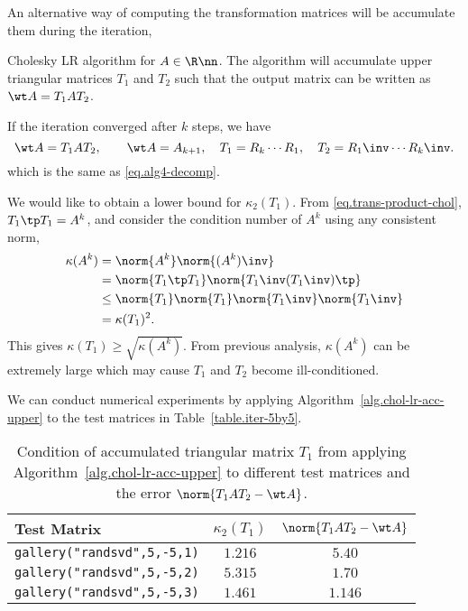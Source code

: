An alternative way of computing the transformation matrices will be
accumulate them during the iteration,
\begin{algorithm}[H]
\caption{Cholesky LR algorithm for $A\in\R\nn$. The algorithm will
  accumulate upper triangular matrices $T_{1}$ and $T_{2}$ such that the
  output matrix can be written as $\wt A = T_{1} A T_{2}$.}
\label{alg.chol-lr-acc-upper}
\begin{algorithmic}[1]
\EndIf
\EndFor
{}
\end{algorithmic}
\end{algorithm}
If the iteration converged after $k$ steps, we have
\begin{equation}\notag
  \wt A = T_{1}AT_{2}, \qquad \wt A = A_{k+1},
  \quad T_{1} = R_{k}\cdots R_{1},
  \quad T_{2} = R_{1}\inv \cdots R_{k}\inv.
\end{equation}
which is the same as \eqref{eq.alg4-decomp}.

We would like to obtain a lower bound for $\kappa_{2}(T_{1})$.
From \eqref{eq.trans-product-chol}, $T_{1}\tp T_{1} = A^{k}$, and consider
the condition number of $A^{k}$ using any consistent norm,
\begin{align*}
  \kappa(A^{k}) & = \norm{A^{k}} \norm{(A^{k})\inv} \\
                & = \norm{T_{1}\tp T_{1}} \norm{T_{1}\inv (T_{1}\inv)\tp} \\
                & \le \norm{T_{1}}\norm{T_{1}}\norm{T_{1}\inv}\norm{T_{1}\inv} \\
                & = \kappa(T_{1})^{2}.
\end{align*}
This gives $\kappa(T_{1}) \ge \sqrt{\kappa(A^{k})}$. From previous
analysis, $\kappa(A^{k})$ can be extremely large which may cause $T_{1}$
and $T_{2}$ become ill-conditioned.

We can conduct numerical experiments by applying
Algorithm~\ref{alg.chol-lr-acc-upper} to the test matrices in
Table~\ref{table.iter-5by5}.

\begin{table}[H]
\centering
\caption{Condition of accumulated triangular matrix $T_1$ from
  applying Algorithm~\ref{alg.chol-lr-acc-upper} to different test
  matrices and the error $\norm{T_{1}AT_{2}-\wt A}$.}
\label{table.condition-of-trig}
\begin{tabular}{lcc} \toprule
  Test Matrix & $\kappa_{2}(T_{1})$  & $\norm{T_{1}AT_{2}-\wt A}$ \\ \midrule
  \texttt{gallery("randsvd",5,-5,1)} & $\num{1.2}{16}$ & $\num{5.4}{0}$\\
  \texttt{gallery("randsvd",5,-5,2)} & $\num{5.3}{15}$ & $\num{1.7}{0}$\\
  \texttt{gallery("randsvd",5,-5,3)} & $\num{1.4}{61}$ & $\num{1.1}{46}$\\
  \bottomrule
\end{tabular}
\end{table}

